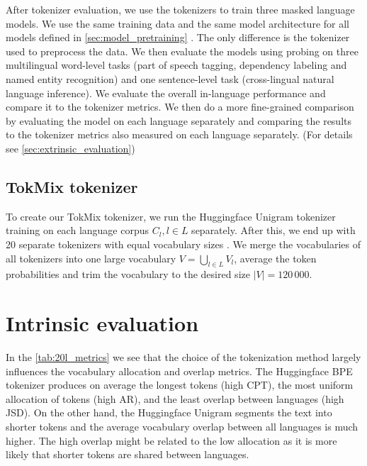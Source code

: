 After tokenizer evaluation, we use the tokenizers to train three masked language models. We use the same training data and the same model architecture for all models defined in \autoref{sec:model_pretraining}  . The only difference is the tokenizer used to preprocess the data. We then evaluate the models using probing on three multilingual word-level tasks (part of speech tagging, dependency labeling and named entity recognition) and one sentence-level task (cross-lingual natural language inference).
 We evaluate the overall in-language performance and compare it to the tokenizer metrics. We then do a more fine-grained comparison by evaluating the model on each language separately and comparing the results to the tokenizer metrics also measured on each language separately. (For details see \autoref{sec:extrinsic_evaluation}) 





\subsection{TokMix tokenizer}

To create our TokMix tokenizer, we run the Huggingface Unigram tokenizer training on each language corpus $C_l, l \in L$ separately. After this, we end up with 20 separate tokenizers with equal vocabulary sizes . We merge the vocabularies of all tokenizers into one large vocabulary $V = \bigcup_{l \in L} V_l$, average the token probabilities and trim the vocabulary to the desired size $|V| = 120\,000$. 

\section{Intrinsic evaluation}



In the \autoref{tab:20l_metrics} we see that the choice of the tokenization method largely influences the vocabulary allocation and overlap metrics. The Huggingface BPE tokenizer produces on average the longest tokens (high CPT), the most uniform allocation of tokens (high AR), and the least overlap between languages (high JSD). On the other hand, the Huggingface Unigram segments the text into shorter tokens and the average vocabulary overlap between all languages is much higher. The high overlap might be related to the low allocation as it is more likely that shorter tokens are shared between languages. 

